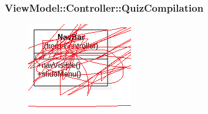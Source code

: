  \subsubsection{ViewModel::Controller::QuizCompilation}
 \begin{figure}[h!]
\begin{center}
	\includegraphics[scale=0.4]{../images/ViewModel/Controller/QuizCompilation.png}
\end{center}
\end{figure}
